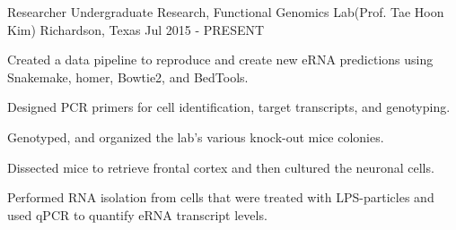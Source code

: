 \begin{cventries}
  \cventry
    {Researcher} %
    {Undergraduate Research, Functional Genomics Lab(Prof. Tae Hoon Kim)} %
    {Richardson, Texas} %
    {Jul 2015 - PRESENT} %
    {
      \begin{cvitems} %
        \item {Created a data pipeline to reproduce and create new eRNA predictions using Snakemake, homer, Bowtie2, and BedTools.}
        \item {Designed PCR primers for cell identification, target transcripts, and genotyping.}
        \item {Genotyped, and organized the lab's various knock-out mice colonies.}
        \item {Dissected mice to retrieve frontal cortex and then cultured the neuronal cells.}
        \item {Performed RNA isolation from cells that were treated with LPS-particles and used qPCR to quantify eRNA transcript levels.}
      \end{cvitems}
    }


\end{cventries}
